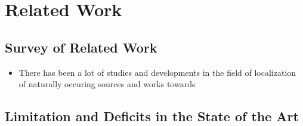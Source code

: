 \documentclass[rnd]{mas_proposal}
\begin{document}
\section{Related Work}

\subsection{Survey of Related Work}
\begin{itemize}
    \item There has been a lot of studies and developments in the field of localization of naturally occuring sources and works towards 
\end{itemize}

\subsection{Limitation and Deficits in the State of the Art}
\begin{itemize}
\end{itemize}
\end{document}
